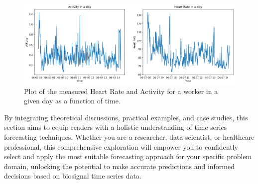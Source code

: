 \documentclass[../main.tex]{subfiles}
\begin{document}
        \begin{figure}[h]
            \begin{center}
            \centering
            \includegraphics[width={\columnwidth}]{images/heart_rate_activity.png}
            \caption{Plot of the measured Heart Rate and Activity for a worker in a given day as a function of time.}
            \label{fig:hr_activity}
            \end{center}
        \end{figure}

        By integrating theoretical discussions, practical examples, and case studies, this section aims to equip readers with a holistic understanding of time series forecasting techniques. Whether you are a researcher, data scientist, or healthcare professional, this comprehensive exploration will empower you to confidently select and apply the most suitable forecasting approach for your specific problem domain, unlocking the potential to make accurate predictions and informed decisions based on biosignal time series data.\par

        
        
\end{document}
